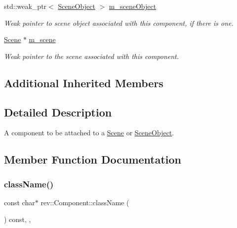 \begin{DoxyCompactItemize}
std\+::weak\+\_\+ptr$<$ \mbox{\hyperlink{classrev_1_1_scene_object}{Scene\+Object}} $>$ \mbox{\hyperlink{classrev_1_1_component_a1fc184df2274ac24e8f0c2eff011f492}{m\+\_\+scene\+Object}}
\begin{DoxyCompactList}\small\item\em Weak pointer to scene object associated with this component, if there is one. \end{DoxyCompactList}\item 
\mbox{\label{classrev_1_1_component_aa3e100f676b272d18988d08278c85de0}} 
\mbox{\hyperlink{classrev_1_1_scene}{Scene}} $\ast$ \mbox{\hyperlink{classrev_1_1_component_aa3e100f676b272d18988d08278c85de0}{m\+\_\+scene}}
\begin{DoxyCompactList}\small\item\em Weak pointer to the scene associated with this component. \end{DoxyCompactList}\end{DoxyCompactItemize}
\subsection*{Additional Inherited Members}


\subsection{Detailed Description}
A component to be attached to a \mbox{\hyperlink{classrev_1_1_scene}{Scene}} or \mbox{\hyperlink{classrev_1_1_scene_object}{Scene\+Object}}. 

\subsection{Member Function Documentation}
\mbox{\label{classrev_1_1_component_a07619152d5acafe7a536df3a6a476349}} 
\subsubsection{\texorpdfstring{className()}{className()}}
{\footnotesize\ttfamily const char$\ast$ rev\+::\+Component\+::class\+Name (\begin{DoxyParamCaption}{ }\end{DoxyParamCaption}) const\hspace{0.3cm}{\ttfamily [inline]}, {\ttfamily [override]}, {\ttfamily [virtual]}}




